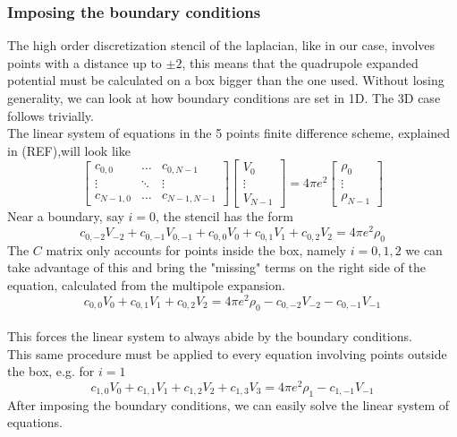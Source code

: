 \subsubsection{Imposing the boundary conditions}
The high order discretization stencil of the laplacian, like in our case, involves points with a distance up to $\pm 2$, this means that the quadrupole expanded potential must be calculated on a box bigger than the one used.
Without losing generality, we can look at how boundary conditions are set in 1D. The 3D case follows trivially.
\\The linear system of equations in the 5 points finite difference scheme, explained in (REF),will look like
\[
\begin{bmatrix}
    c_{0,0} & \ldots & c_{0,N-1} \\
    \vdots & \ddots & \vdots \\
    c_{N-1,0} & \ldots & c_{N-1,N-1}
\end{bmatrix}
\begin{bmatrix}
    V_0 \\ \vdots \\ V_{N-1}
\end{bmatrix}
=
4\pi e^2
\begin{bmatrix}
    \rho_0 \\ \vdots \\ \rho_{N-1}
\end{bmatrix}
\]
Near a boundary, say $i=0$, the stencil has the form
\begin{equation}
    c_{0,-2}V_{-2} + c_{0,-1}V_{0,-1} + c_{0,0}V_0 + c_{0,1}V_1 + c_{0,2}V_2 = 4\pi e^2 \rho_0
\end{equation}
The $C$ matrix only accounts for points inside the box, namely $i=0, 1, 2$ we can take advantage of this and bring the "missing" terms on the right side of the equation, calculated from the multipole expansion.
\[
c_{0,0} V_0 + c_{0,1} V_1 + c_{0,2} V_2 = 4\pi e^2 \rho_0 - c_{0,-2}V_{-2} - c_{0,-1}V_{-1}
\]
\\This forces the linear system to always abide by the boundary conditions.
\\This same procedure must be applied to every equation involving points outside the box, e.g. for $i=1$
\[
c_{1,0} V_0 + c_{1,1} V_1 + c_{1,2} V_2 + c_{1,3} V_3 = 4\pi e^2 \rho_1 - c_{1,-1}V_{-1} 
\]
After imposing the boundary conditions, we can easily solve the linear system of equations.
